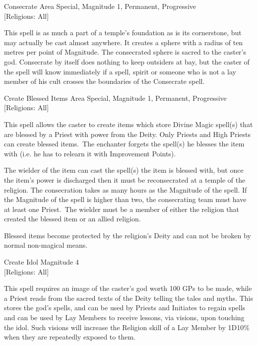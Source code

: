 \begin{rpg-spell}
{Consecrate}
{Area Special, Magnitude 1, Permanent, Progressive\\{[Religions: All]}}

This spell is as much a part of a temple’s foundation as is its cornerstone, but may actually be cast almost anywhere. It creates a sphere with a radius of ten metres per point of Magnitude. The consecrated sphere is sacred to the caster’s god. Consecrate by itself does nothing to keep outsiders at bay, but the caster of the spell will know immediately if a spell, spirit or someone who is not a lay member of his cult crosses the boundaries of the Consecrate spell.
\end{rpg-spell}

\begin{rpg-spell}
{Create Blessed Items}
{Area Special, Magnitude 1, Permanent, Progressive\\{[Religions: All]}}

This spell allows the caster to create items which store Divine Magic spell(s) that are blessed by a Priest with power from the Deity. Only Priests and High Priests can create blessed items. The enchanter forgets the spell(s) he blesses the item with (i.e. he has to relearn it with Improvement Points).

The wielder of the item can cast the spell(s) the item is blessed with, but once the item’s power is discharged then it must be reconsecrated at a temple of the religion. The consecration takes as many hours as the Magnitude of the spell. If the Magnitude of the spell is higher than two, the consecrating team must have at least one Priest. The wielder must be a member of either the religion that created the blessed item or an allied religion. 

Blessed items become protected by the religion’s Deity and can not be broken by normal non-magical means. 
\end{rpg-spell}

\begin{rpg-spell}
{Create Idol}
{Magnitude 4\\{[Religions: All]}}

This spell requires an image of the caster’s god worth 100 GPs to be made, while a Priest reads from the sacred texts of the Deity telling the tales and myths. This stores the god’s spells, and can be used by Priests and Initiates to regain spells and can be used by Lay Members to receive lessons, via visions, upon touching the idol. Such visions will increase the Religion skill of a Lay Member by 1D10\% when they are repeatedly exposed to them. 
\end{rpg-spell}

